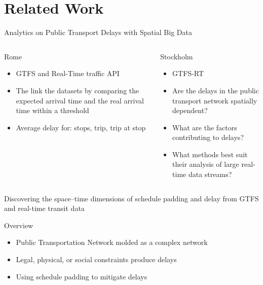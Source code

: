\documentclass[xcolor=dvipsnames,table]{beamer}
\begin{document}
\section{Related Work}
\begin{frame}{Analytics on Public Transport Delays with Spatial Big Data}
        \begin{columns}
                \begin{block}{Rome}
                        \begin{itemize}
                                \item GTFS and Real-Time traffic API
                                \item The link the datasets by comparing the
                                        expected arrival time and the real arrival time within a threshold
                                \item Average delay for: stops, trip, trip at stop
                        \end{itemize}
                \end{block}
                \begin{block}{Stockholm}
                        \begin{itemize}
                                \item GTFS-RT 
                                \item Are the delays in the public transport network spatially dependent?
                                \item What are the factors contributing to delays?
                                \item What methods best suit their analysis of large real-time data streams?
                        \end{itemize}
                \end{block}
        \end{columns}
\end{frame}

\begin{frame}{Discovering the space–time dimensions of schedule padding and delay from GTFS and real-time transit data}
        \begin{block}{Overview}
                \begin{itemize}
                        \item Public Transportation Network molded as a complex network
                        \item Legal, physical, or social constraints produce delays
                        \item Using schedule padding to mitigate delays
                \end{itemize}
        \end{block}
\end{frame}
\end{document}
